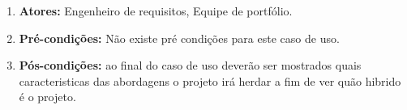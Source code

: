 \begin{enumerate}
	\item \textbf{Atores:}
		Engenheiro de requisitos, Equipe de portfólio. 
	\item \textbf{Pré-condições:}
		Não existe pré condições para este caso de uso.
	\item \textbf{Pós-condições:}
		ao final do caso de uso deverão ser mostrados quais caracteristicas das abordagens o projeto irá herdar a fim de ver quão hibrido é o projeto.
\end{enumerate}
